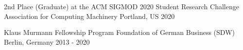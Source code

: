 \begin{cvhonors}
\cvhonor
    {2nd Place (Graduate) at the ACM SIGMOD 2020 Student Research Challenge} %
    {Association for Computing Machinery} %
    {Portland, US} %
    {2020} %


  \cvhonor
    {Klaus Murmann Fellowship Program} %
    {Foundation of German Business (SDW)} %
    {Berlin, Germany} %
    {2013 - 2020} %

\end{cvhonors}
